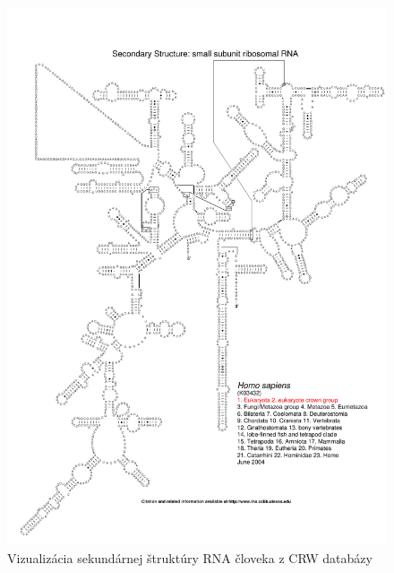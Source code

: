 \begin{figure}
  \includegraphics[width=1\textwidth]{../img/human_crw}
  \caption{Vizualizácia sekundárnej štruktúry RNA človeka z CRW databázy }
  \label{obr:RNA_human_crw}
\end{figure}

